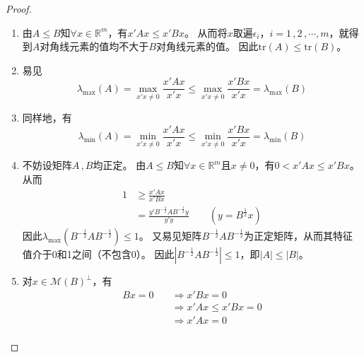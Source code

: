 \documentclass[10pt]{article}
\theoremstyle{definition}
\theoremstyle{definition}
\begin{document}
\begin{enumerate}
    \begin{proof}
        \begin{enumerate}[label=(\roman*)]
            \item
                由$A\le B$知$\forall x \in \mathbb{R}^m$，有$x'Ax \le x'Bx$。
                从而将$x$取遍$\epsilon_i\text{，}i=1\, ,2\, ,\cdots ,m$，就得到$A$对角线元素的值均不大于$B$对角线元素的值。
                因此$\mathrm{tr}(A) \le \mathrm{tr}(B)$。
            \item
                易见
                \begin{equation*}
                    \lambda_{\max}(A)=\max_{x'x\ne 0}\frac{x'Ax}{x'x} \le \max_{x'x\ne 0}\frac{x'Bx}{x'x}=\lambda_{\max}(B)
                \end{equation*}
            \item
                同样地，有 \begin{equation*}
                    \lambda_{\min}(A)=\min_{x'x\ne 0}\frac{x'Ax}{x'x} \le \min_{x'x\ne 0}\frac{x'Bx}{x'x}=\lambda_{\min}(B)
                \end{equation*}
            \item
                不妨设矩阵$A\, ,B$均正定。
                由$A\le B$知$\forall x\in \mathbb{R}^m$且$x\ne 0$，有$0 < x'Ax \le x'Bx$。
                从而
                \begin{equation*}
                    \begin{aligned}
                        1 & \ge \frac{x'Ax}{x'Bx} \\
                          & = \frac{y'B^{-\frac 12}AB^{-\frac 12}y}{y'y} \qquad (y=B^{\frac 12}x)
                    \end{aligned}
                \end{equation*}
                因此$\lambda_{\max}(B^{-\frac 12}AB^{-\frac 12})\le 1$。
                又易见矩阵$B^{-\frac 12}AB^{-\frac 12}$为正定矩阵，从而其特征值介于0和1之间（不包含0）。
                因此$|B^{-\frac 12}AB^{-\frac 12}|\le 1$，即$|A|\le |B|$。
            \item
                对$x\in \mathcal{M}(B)^{\perp}$，有
                \begin{equation*}
                    \begin{aligned}
                        Bx=0 & \quad \Rightarrow x'Bx=0 \\
                             & \quad \Rightarrow x'Ax \le x'Bx=0 \\
                             & \quad \Rightarrow x'Ax=0 \\

\end{aligned}
\end{equation*}
\end{enumerate}
\end{proof}
\end{enumerate}
\end{document}
